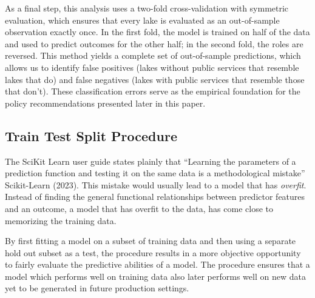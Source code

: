 \documentclass[
]{article}
\begin{document}
As a final step, this analysis uses a two-fold cross-validation with
symmetric evaluation, which ensures that every lake is evaluated as an
out-of-sample observation exactly once. In the first fold, the model is
trained on half of the data and used to predict outcomes for the other
half; in the second fold, the roles are reversed. This method yields a
complete set of out-of-sample predictions, which allows us to identify
false positives (lakes without public services that resemble lakes that
do) and false negatives (lakes with public services that resemble those
that don't). These classification errors serve as the empirical
foundation for the policy recommendations presented later in this paper.

\subsection{Train Test Split
Procedure}\label{train-test-split-procedure}

The SciKit Learn user guide states plainly that ``Learning the
parameters of a prediction function and testing it on the same data is a
methodological mistake'' Scikit-Learn (2023). This mistake would usually
lead to a model that has \emph{overfit}. Instead of finding the general
functional relationships between predictor features and an outcome, a
model that has overfit to the data, has come close to memorizing the
training data.

By first fitting a model on a subset of training data and then using a
separate hold out subset as a test, the procedure results in a more
objective opportunity to fairly evaluate the predictive abilities of a
model. The procedure ensures that a model which performs well on
training data also later performs well on new data yet to be generated
in future production settings.
\end{document}
